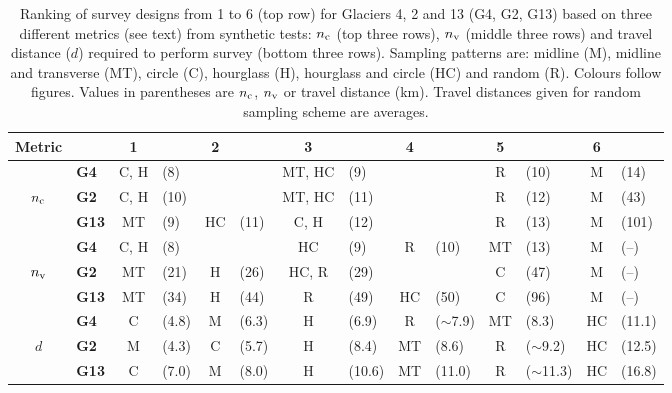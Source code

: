 \documentclass[twocolumn,letterpaper]{igs}
\begin{document}
\begin{table}[]
\centering
\caption{ Ranking of survey designs from 1 to 6 (top row) for Glaciers 4, 2 and 13 (G4, G2, G13) based on three different metrics (see text) from synthetic tests: $n_{\rm c}$ (top three rows), $n_{\rm v}$ (middle three rows) and travel distance ($d$) required to perform survey (bottom three rows). Sampling patterns are: midline (M), midline and transverse (MT), circle (C), hourglass (H), hourglass and circle (HC) and random (R). Colours follow figures. Values in parentheses are $n_{\rm c}$, $n_{\rm v}$ or travel distance (km). Travel distances given for random sampling scheme are averages.}
\label{tab:PatternRanks}
\begin{tabular}{clclclclclclcl}
\hline
 Metric 	&& \textbf{1} && \textbf{2} && \textbf{3} && \textbf{4} && \textbf{5} && \textbf{6} \\ 
 \hline
		& \textbf{G4}    & \textcolor{C}{C}, \textcolor{H}{H} 	& (8) 	&  	& 	&  \textcolor{MT}{MT}, \textcolor{HC}{HC}  	& (9) 	&  	&   	& \textcolor{R}{R} 	& (10) & \textcolor{M}{M} & (14) \\
$n_{\rm c}$ 	& \textbf{G2}   & \textcolor{C}{C}, \textcolor{H}{H} 	& (10) 	&  	&   	& \textcolor{MT}{MT}, \textcolor{HC}{HC} 	& (11) 	&  	&  	& \textcolor{R}{R} 	& (12) & \textcolor{M}{M} & (43) \\ 
		& \textbf{G13} & \textcolor{MT}{MT} 	& (9) 	& \textcolor{HC}{HC} & (11) 	& \textcolor{C}{C}, \textcolor{H}{H} 		& (12) 	&  		&   	& \textcolor{R}{R} 	& (13) & \textcolor{M}{M} & (101) \\ 
\hline
		& \textbf{G4}   & \textcolor{C}{C},  \textcolor{H}{H} 	& (8) 	& 	&   	& \textcolor{HC}{HC} 	& (9) 	& \textcolor{R}{R} 		& (10) 	& \textcolor{MT}{MT} & (13) & \textcolor{M}{M} & (--) \\
$n_{\rm v}$ 	& \textbf{G2}   & \textcolor{MT}{MT} 	& (21) 	& \textcolor{H}{H} 	& (26) 	& \textcolor{HC}{HC},  \textcolor{R}{R} 	& (29)	&  		& 	&  \textcolor{C}{C} 	& (47) & \textcolor{M}{M} & (--) \\ 
		& \textbf{G13} & \textcolor{MT}{MT} 	& (34) 	& \textcolor{H}{H} 	& (44) 	& \textcolor{R}{R} 		& (49) 	& \textcolor{HC}{HC} 	& (50) 	& \textcolor{C}{C} 	& (96) & \textcolor{M}{M} & (--) \\ 
\hline
		& \textbf{G4}   & \textcolor{C}{C} 	& (4.8) & \textcolor{M}{M} 	& (6.3) & \textcolor{H}{H} 		& (6.9) 	& \textcolor{R}{R} 	& ($\sim$7.9) & \textcolor{MT}{MT} 	& (8.3) & \textcolor{HC}{HC} & (11.1) \\ 
$d$	& \textbf{G2}   & \textcolor{M}{M} 	& (4.3) & \textcolor{C}{C} 	& (5.7) & \textcolor{H}{H} 		& (8.4) 	& \textcolor{MT}{MT} & (8.6) 	& \textcolor{R}{R} 		& ($\sim$9.2) & \textcolor{HC}{HC} & (12.5) \\ 
		& \textbf{G13} & \textcolor{C}{C} 	& (7.0) & \textcolor{M}{M} 	& (8.0) & \textcolor{H}{H} 		& (10.6) 	& \textcolor{MT}{MT} & (11.0) 	& \textcolor{R}{R} 		& ($\sim$11.3) & \textcolor{HC}{HC} & (16.8)\\
\hline
\end{tabular}
\end{table}
\end{document}

